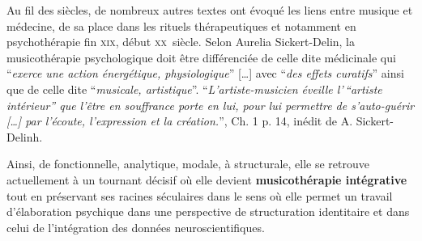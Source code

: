 Au fil des siècles, de nombreux autres
textes ont évoqué les liens entre musique et médecine, de sa place dans les
rituels thérapeutiques et notamment en psychothérapie fin \textsc{xix}\ieme,
début \textsc{xx}\ieme\ siècle.
Selon Aurelia Sickert-Delin, la musicothérapie
psychologique doit être différenciée de celle dite médicinale qui
\enquote{\emph{exerce une action
énergétique, physiologique}} [\dots] avec \enquote{\emph{des effets curatifs}}
ainsi que de celle dite \enquote{\emph{musicale, artistique}}.
\enquote{\emph{L'artiste-musicien éveille l'\,``artiste intérieur'' que l'être
en souffrance porte en lui, pour lui permettre de s'auto-guérir [\dots] par
l'écoute, l'expression et la création.}}\autocite {viret:b}, Ch. 1 p. 14,
inédit de A. Sickert-Delinh.

 Ainsi, de fonctionnelle, analytique, mo\-da\-le,  à
struc\-tu\-rale, elle se retrouve actuellement
 à un tournant décisif où elle devient
 \textbf{ musicothérapie intégrative} tout en préservant ses racines
 séculaires dans le sens où elle permet un travail d'élaboration psychique dans une perspective de structuration identitaire \autocite[p.105]{vrait_musicotherapie_2018} et dans celui de l'intégration des données
neuroscientifiques.






